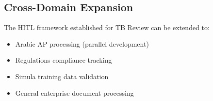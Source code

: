 \subsection{Cross-Domain Expansion}

The HITL framework established for TB Review can be extended to:

\begin{itemize}[noitemsep]
  \item Arabic AP processing (parallel development)
  \item Regulations compliance tracking
  \item Simula training data validation
  \item General enterprise document processing
\end{itemize}